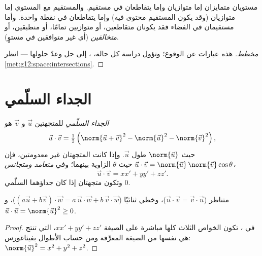 \begin{proposition}\label{prop:g12:space:positions}
مستويان متمايزان إما متوازيان وإما يتقاطعان في مستقيم. والمستقيم مع
المستوي إما متوازيان (وقد يكون المستقيم محتوى فيه) وإما يتقاطعان في نقطة
واحدة. وأما مستقيمان في الفضاء فقد يكونان متقاطعين، أو متوازيين تمامًا، أو منطبقين،
أو \emph{متخالفين} (أي غير متوافقين في مستوٍ).
\end{proposition}

\begin{proof}[مخطط]
هذه عبارات عن الوقوع؛ وتؤول دراسة كل حالة، ،
إلى حل  وعدّ حلولها --- انظر
\cref{met:g12:space:intersections}.
\end{proof}

\section{الجداء السلّمي}

\begin{definition}\label{def:g12:space:dot}
\emph{الجداء السلّمي} للمتجهتين $\vec u$ و $\vec v$ هو
\[
\vec u \cdot \vec v = \tfrac12\left(\norm{\vec u + \vec v}^2
- \norm{\vec u}^2 - \norm{\vec v}^2\right),
\]
حيث $\norm{\vec u}$ طول $\vec u$. وإذا كانت المتجهتان غير معدومتين،
فإن $\vec u \cdot \vec v = \norm{\vec u}\,\norm{\vec v}\cos\theta$
حيث $\theta$ الزاوية بينهما؛ وفي 
\emph{متعامد ومتجانس}،
\[
\vec u \cdot \vec v = xx' + yy' + zz' .
\]
وتكون متجهتان \emph{} إذا كان جداؤهما السلّمي $0$.
\end{definition}

\begin{proposition}[الخواص]\label{prop:g12:space:dotprops}
 متناظر ($\vec u\cdot\vec v = \vec v\cdot\vec u$)،
وخطي ثنائيًا ($(a\vec u + b\vec v)\cdot \vec w = a\,\vec u\cdot\vec w +
b\,\vec v\cdot \vec w$)، و
$\vec u \cdot \vec u = \norm{\vec u}^2 \geq 0$.
\end{proposition}

\begin{proof}
في ، تكون الخواص الثلاث كلها مباشرة على الصيغة
$xx' + yy' + zz'$، التي تنتج هي نفسها من الصيغة المعرِّفة ومن
حساب الأطوال بفيثاغورس:
$\norm{\vec u}^2 = x^2 + y^2 + z^2$.
\end{proof}

